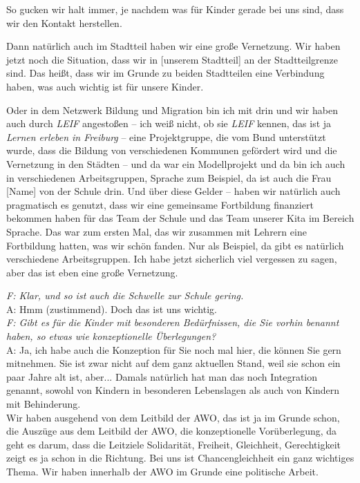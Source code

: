 \begin{linenumbers*}
So gucken wir halt immer, je nachdem was für Kinder gerade bei uns sind, dass wir den Kontakt herstellen. 

Dann natürlich auch im Stadtteil haben wir eine große Vernetzung. Wir haben jetzt noch die Situation, dass wir in {[unserem Stadtteil]} an der Stadtteilgrenze sind. Das heißt, dass wir im Grunde zu beiden Stadtteilen eine Verbindung haben, was auch wichtig ist für unsere Kinder.

Oder in dem Netzwerk Bildung und Migration bin ich mit drin und wir haben auch durch \emph{LEIF} angestoßen -- ich weiß nicht, ob sie \emph{LEIF} kennen, das ist ja \emph{Lernen erleben in Freiburg} -- eine Projektgruppe, die vom Bund unterstützt wurde, dass die Bildung von verschiedenen Kommunen gefördert wird und die Vernetzung in den Städten  -- und da war ein Modellprojekt und da bin ich auch in verschiedenen Arbeitsgruppen, Sprache zum Beispiel, da ist auch die Frau {[Name]} von der Schule drin.
Und über diese Gelder -- haben wir natürlich auch pragmatisch es genutzt, dass wir eine gemeinsame Fortbildung finanziert bekommen haben für das Team der Schule und das Team unserer Kita im Bereich Sprache. Das war zum ersten Mal, das wir zusammen mit Lehrern eine Fortbildung hatten, was wir schön fanden. Nur als Beispiel, da gibt es natürlich verschiedene Arbeitsgruppen. Ich habe jetzt sicherlich viel vergessen zu sagen, aber das ist eben eine große Vernetzung. 

\emph{F: Klar, und so ist auch die Schwelle zur Schule gering.}\\
A: Hmm (zustimmend). Doch das ist uns wichtig.\\

\emph{F: Gibt es für die Kinder mit besonderen Bedürfnissen, die Sie vorhin benannt haben, so etwas wie konzeptionelle Überlegungen?}\\
A: Ja, ich habe auch die Konzeption für Sie noch mal hier, die können Sie gern mitnehmen. Sie ist zwar nicht auf dem ganz aktuellen Stand, weil sie schon ein paar Jahre alt ist, aber... Damals natürlich hat man das noch Integration genannt, sowohl von Kindern in besonderen Lebenslagen als auch von Kindern mit Behinderung.\\
Wir haben ausgehend von dem Leitbild der AWO, das ist ja im Grunde schon, die Auszüge aus dem Leitbild der AWO, die konzeptionelle Vorüberlegung, da geht es darum, dass die Leitziele Solidarität, Freiheit, Gleichheit, Gerechtigkeit zeigt es ja schon in die Richtung.
Bei uns ist Chancengleichheit ein ganz wichtiges Thema.
Wir haben innerhalb der AWO im Grunde eine politische Arbeit. 


\end{linenumbers*}
